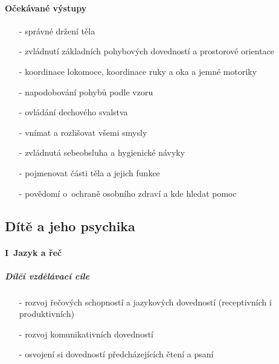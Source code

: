 				\paragraph{Očekávané výstupy}

				\begin{itemize}
				\setlength\itemsep{-2mm}
					\item[-]správné držení těla
					\item[-]zvládnutí základních pohybových dovedností a prostorové orientace
					\item[-]koordinace lokomoce, koordinace ruky a oka a jemné motoriky
					\item[-]napodobování pohybů podle vzoru
					\item[-]ovládání dechového svalstva
					\item[-]vnímat a rozlišovat všemi smysly
					\item[-]zvládnutá sebeobsluha a hygienické návyky
					\item[-]pojmenovat části těla a jejich funkce
					\item[-]povědomí o~ochraně osobního zdraví a kde hledat pomoc
				\end{itemize}

			\subsection{Dítě a jeho psychika}
				\textit{} \citep[s.~18]{RVP}
				\paragraph{I~Jazyk a řeč}
				 
					\subparagraph{Dílčí vzdělávací cíle}

					\begin{itemize}
					\setlength\itemsep{-2mm}
						\item[-]rozvoj řečových schopností a jazykových dovedností  (receptivních i produktivních)
						\item[-]rozvoj komunikativních dovedností
						\item[-]osvojení si dovedností předcházejících čtení a psaní
					\end{itemize}
					
